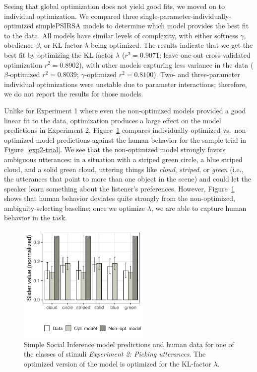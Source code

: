 \documentclass[10pt,a4paper]{article}
\begin{document}
Seeing that global optimization does not yield good fits, we moved on to individual optimization. 
We compared three single-parameter-individually-optimized simplePSIRSA models to determine which model provides the best fit to the data. 
All models have similar levels of complexity, with either softness $\gamma$, obedience $\beta$, or KL-factor $\lambda$ being optimized.
The results indicate that we get the best fit by optimizing the KL-factor $\lambda$ ($r^{2}=0.9071$; leave-one-out cross-validated optimization $r^{2}=0.8902$), with other models capturing less variance in the data ($\beta$-optimized $r^{2}=0.8039$; $\gamma$-optimized $r^{2}=0.8100$).
Two- and three-parameter individual optimizations were unstable due to parameter interactions; therefore, we do not report the results for those models.

Unlike for Experiment 1 where even the non-optimized models provided a good linear fit to the data, optimization produces a large effect on the model predictions in Experiment 2. Figure~\ref{barplot_x3} compares individually-optimized vs.~non-optimized model predictions against the human behavior for the sample trial in Figure~\ref{exp2-trial}. We see that the non-optimized model strongly favors ambiguous utterances: in a situation with a striped green circle, a blue striped cloud, and a solid green cloud, uttering things like \textit{cloud}, \textit{striped}, or \textit{green} (i.e., the utterances that point to more than one object in the scene) and could let the speaker learn something about the listener's preferences. However, Figure~\ref{barplot_x3} shows that human behavior deviates quite strongly from the non-optimized, ambiguity-selecting baseline; once we optimize $\lambda$, we are able to capture human behavior in the task.

\begin{figure}[ht!]
	\centering
	\includegraphics[width=2.5in]{images/december_barplot_x3.pdf}
	\caption{Simple Social Inference model predictions and human data for one of the classes of stimuli \emph{Experiment 2: Picking utterances}. The optimized version of the model is optimized for the KL-factor $\lambda$.}\label{barplot_x3}
\end{figure}
\end{document}
